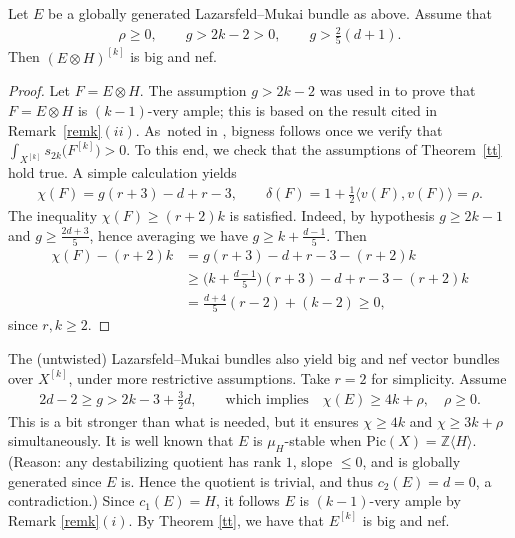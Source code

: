 \documentclass[pdftex]{sigma}
\numberwithin{equation}{section}
\begin{document}
\begin{Example}%
Let $E$ be a globally generated Lazarsfeld--Mukai bundle as above. Assume that
\begin{gather*}
\rho\geq 0, \qquad g>2k-2>0, \qquad g> \frac{2}{5}(d+1).
\end{gather*}
Then $(E\otimes H)^{[k]}$ is big and nef.
\end{Example}

\begin{proof}
Let $F=E\otimes H$. The assumption $g>2k-2$ was used in \cite[Theorem~5.5]{BBF} to prove that $F=E\otimes H$ is $(k-1)$-very ample; this is based on the result cited in Remark~\ref{remk}$(ii)$. As~noted in \cite{BBF}, bigness follows once we verify that $\int_{X^{[k]}} s_{2k}\big(F^{[k]}\big)>0$. To this end, we check that the assumptions of Theorem~\ref{tt} hold true. A simple calculation yields
\begin{gather*}
\chi(F)=g(r+3) -d +r-3,\qquad \delta(F)=1+\frac{1}{2} \langle v(F), v(F)\rangle=\rho.
\end{gather*}
The inequality $\chi(F)\geq (r+2)k$ is satisfied.
Indeed, by hypothesis $g\geq 2k-1$ and $g\geq \frac{2d+3}{5}$, hence averaging we have $g\geq k+\frac{d-1}{5}$. Then
\begin{align*}
\chi(F)-(r+2)k&=g(r+3)-d+r-3-(r+2)k
\\
&\geq \biggl(k+\frac{d-1}{5}\biggr)(r+3)-d+r-3-(r+2)k
\\
&=\frac{d+4}{5}(r-2)+(k-2)\geq 0,
\end{align*}
since $r, k\geq 2$.
\end{proof}

\begin{Example} The (untwisted) Lazarsfeld--Mukai bundles also yield big and nef vector bundles over $X^{[k]}$, under more restrictive assumptions. Take $r=2$ for simplicity. Assume
\begin{gather*}
2d-2\geq g> 2k-3+ \frac{3}{2}d,\qquad \text{which implies} \quad \chi(E)\geq 4k+\rho, \quad \rho\geq 0.
\end{gather*}
This is a bit stronger than what is needed, but it ensures $\chi\geq 4k$ and $\chi\geq 3k+\rho$ simultaneously. It is well known that $E$ is $\mu_H$-stable when $\text{Pic}(X)=\mathbb Z\langle H\rangle$. (Reason: any destabilizing quotient has rank $1$, slope $\leq 0$, and is globally generated since $E$ is. Hence the quotient is trivial, and thus $c_2(E)=d=0$, a contradiction.) Since $c_1(E)=H$, it follows $E$ is $(k-1)$-very ample by Remark \ref{remk}$(i)$. By Theorem \ref{tt}, we have that $E^{[k]}$ is big and nef.
\end{Example}
\end{document}
